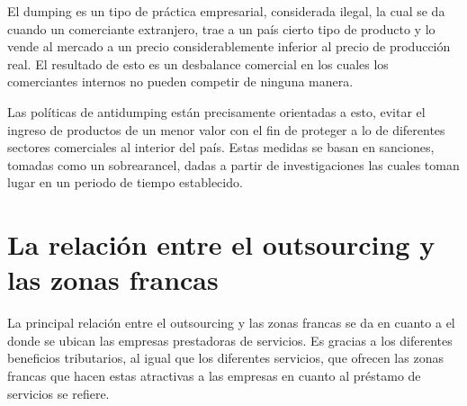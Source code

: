 \documentclass[10pt]{article}
\begin{document}
    El dumping es un tipo de práctica empresarial, considerada ilegal, la cual se da cuando un comerciante extranjero, trae a un país cierto tipo de producto y lo vende al mercado a un precio considerablemente inferior al precio de producción real. El resultado de esto es un desbalance comercial en los cuales los comerciantes internos no pueden competir de ninguna manera. \cite{ref:dump}
    
    Las políticas de antidumping están precisamente orientadas a esto, evitar el ingreso de productos de un menor valor con el fin de proteger a lo de diferentes sectores comerciales al interior del país. Estas medidas se basan en sanciones, tomadas como un sobrearancel, dadas a partir de investigaciones las cuales toman lugar en un periodo de tiempo establecido. \cite{ref:antidump}
    

\section{La relación entre el outsourcing y las zonas francas}

    La principal relación entre el outsourcing y las zonas francas se da en cuanto a el donde se ubican las empresas prestadoras de servicios. Es gracias a los diferentes beneficios tributarios, al igual que los diferentes servicios, que ofrecen las zonas francas que hacen estas atractivas a las empresas en cuanto al préstamo de servicios se refiere. 
    \cite{ref:zonafrancasantander}

\pagebreak



\end{document}
